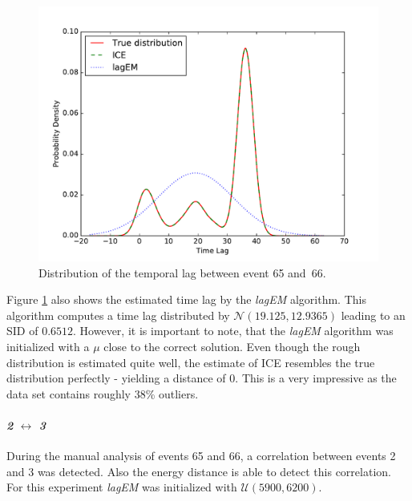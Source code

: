 \documentclass[conference]{IEEEtran}
\theoremstyle{examplestyle}
\begin{document}
\begin{figure}[!tb]
	\centering
	\includegraphics[scale=0.4]{images/symantec/66-65.pdf}
	\caption{Distribution of the temporal lag between event 65 and~66.}
	\label{fig:66-65}
\end{figure}

Figure \ref{fig:66-65} also shows the estimated time lag by the \textit{lagEM} algorithm. This algorithm computes a time lag distributed by \(\mathcal{N}(19.125, 12.9365)\) leading to an \ac{SID} of $0.6512$. However, it is important to note, that the \textit{lagEM} algorithm was initialized with a \(\mu\) close to the correct solution. Even though the rough distribution is estimated quite well, the estimate of \ac{ICE} resembles the true distribution perfectly - yielding a distance of $0$. This is a very impressive as the data set contains roughly 38\% outliers.



\paragraph{\textit{2} \(\leftrightarrow\) \textit{3}} During the manual analysis of events 65 and 66, a correlation between events 2 and 3 was detected. Also the energy distance is able to detect this correlation. For this experiment \textit{lagEM} was initialized with \(\mathcal{U}(5900, 6200)\).
\end{document}
